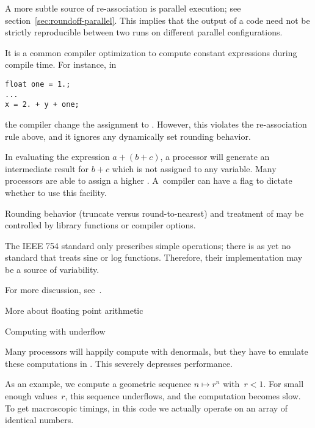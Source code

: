 A more subtle source of re-association is parallel execution; 
see section~\ref{sec:roundoff-parallel}. This implies that the output
of a code need not be strictly reproducible between two runs on
different parallel configurations.


%
It is a common compiler optimization to compute constant expressions
during compile time. For instance, in
\begin{verbatim}
float one = 1.;
...
x = 2. + y + one;
\end{verbatim}
the compiler change the assignment to . However, this
violates the re-association rule above, and it ignores any dynamically
set rounding behavior.

In evaluating the expression $a+(b+c)$, a processor will generate an 
intermediate result for $b+c$ which is not assigned to any variable.
Many processors are able to assign a higher 
.
A~compiler can have a flag to dictate whether to use this facility.

%
Rounding behavior (truncate versus round-to-nearest) and treatment of
 may be controlled by library
functions or compiler options.

The IEEE 754 standard only prescribes simple operations;
there is as yet no standard that treats sine or log functions.
Therefore, their implementation may be a source of variability.

For more discussion, see~\cite{Lionel:reproducibility}.


 {More about floating point arithmetic}

 {Computing with underflow}
\label{sec:subcompute}

Many processors will happily compute with denormals,
but they have to emulate these computations in .
This severely depresses performance.

As an example, we compute a geometric sequence $n\mapsto r^n$ with~$r<1$.
For small enough values~$r$, this sequence underflows, and the computation becomes slow.
To get macroscopic timings, in this code we actually operate on an array
of identical numbers.


